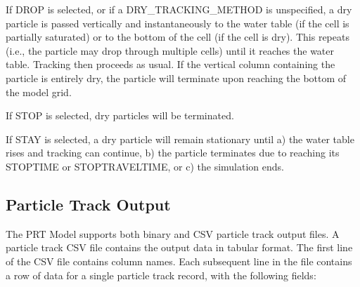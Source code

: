 If DROP is selected, or if a DRY\_TRACKING\_METHOD is unspecified, a dry particle is passed vertically and instantaneously to the water table (if the cell is partially saturated) or to the bottom of the cell (if the cell is dry). This repeats (i.e., the particle may drop through multiple cells) until it reaches the water table. Tracking then proceeds as usual. If the vertical column containing the particle is entirely dry, the particle will terminate upon reaching the bottom
of the model grid.

If STOP is selected, dry particles will be terminated.

If STAY is selected, a dry particle will remain stationary until a) the water table rises and tracking can continue, b) the particle terminates due to reaching its STOPTIME or STOPTRAVELTIME, or c) the simulation ends.

\subsection{Particle Track Output}

The PRT Model supports both binary and CSV particle track output files. A particle track CSV file contains the output data in tabular format. The first line of the CSV file contains column names. Each subsequent line in the file contains a row of data for a single particle track record, with the following fields:

